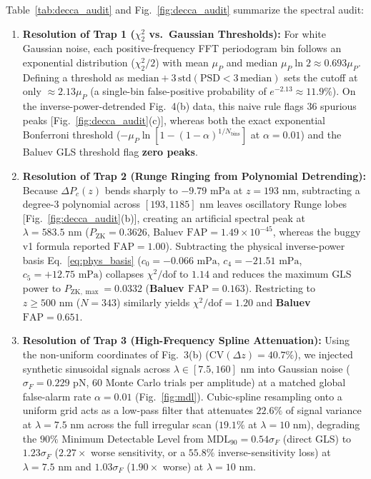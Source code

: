 \documentclass[10pt,twocolumn,a4paper]{article}
\begin{document}
Table~\ref{tab:decca_audit} and Fig.~\ref{fig:decca_audit} summarize the spectral audit:
\begin{enumerate}
\item \textbf{Resolution of Trap 1 ($\chi^2_2$ vs.\ Gaussian Thresholds):} For white Gaussian noise, each positive-frequency FFT periodogram bin follows an exponential distribution ($\chi^2_2/2$) with mean $\mu_P$ and median $\mu_P \ln 2 \approx 0.693\mu_P$. Defining a threshold as $\mathrm{median} + 3\,\mathrm{std}(\mathrm{PSD} < 3\,\mathrm{median})$ sets the cutoff at only $\approx 2.13\mu_P$ (a single-bin false-positive probability of $e^{-2.13} \approx 11.9\%$). On the inverse-power-detrended Fig.~4(b) data, this naive rule flags $36$ spurious peaks [Fig.~\ref{fig:decca_audit}(c)], whereas both the exact exponential Bonferroni threshold ($-\mu_P \ln[1 - (1-\alpha)^{1/N_{\mathrm{bins}}}]$ at $\alpha = 0.01$) and the Baluev GLS threshold flag \textbf{zero peaks}.
\item \textbf{Resolution of Trap 2 (Runge Ringing from Polynomial Detrending):} Because $\Delta P_c(z)$ bends sharply to $-9.79\text{ mPa}$ at $z = 193\text{ nm}$, subtracting a degree-3 polynomial across $[193, 1185]\text{ nm}$ leaves oscillatory Runge lobes [Fig.~\ref{fig:decca_audit}(b)], creating an artificial spectral peak at $\lambda = 583.5\text{ nm}$ ($P_{\mathrm{ZK}} = 0.3626$, Baluev $\mathrm{FAP} = 1.49\times 10^{-45}$, whereas the buggy v1 formula reported $\mathrm{FAP} = 1.00$). Subtracting the physical inverse-power basis Eq.~\eqref{eq:phys_basis} ($c_0 = -0.066\text{ mPa}$, $c_4 = -21.51\text{ mPa}$, $c_5 = +12.75\text{ mPa}$) collapses $\chi^2/\mathrm{dof}$ to $1.14$ and reduces the maximum GLS power to $P_{\mathrm{ZK},\max} = 0.0332$ (\textbf{Baluev $\mathrm{FAP} = 0.163$}). Restricting to $z \ge 500\text{ nm}$ ($N = 343$) similarly yields $\chi^2/\mathrm{dof} = 1.20$ and \textbf{Baluev $\mathrm{FAP} = 0.651$}.
\item \textbf{Resolution of Trap 3 (High-Frequency Spline Attenuation):} Using the non-uniform coordinates of Fig.~3(b) ($\mathrm{CV}(\Delta z) = 40.7\%$), we injected synthetic sinusoidal signals across $\lambda \in [7.5, 160]\text{ nm}$ into Gaussian noise ($\sigma_F = 0.229\text{ pN}$, $60$ Monte Carlo trials per amplitude) at a matched global false-alarm rate $\alpha = 0.01$ (Fig.~\ref{fig:mdl}). Cubic-spline resampling onto a uniform grid acts as a low-pass filter that attenuates $22.6\%$ of signal variance at $\lambda = 7.5\text{ nm}$ across the full irregular scan ($19.1\%$ at $\lambda = 10\text{ nm}$), degrading the $90\%$ Minimum Detectable Level from $\mathrm{MDL}_{90} = 0.54\sigma_F$ (direct GLS) to $1.23\sigma_F$ ($2.27\times$ worse sensitivity, or a $55.8\%$ inverse-sensitivity loss) at $\lambda = 7.5\text{ nm}$ and $1.03\sigma_F$ ($1.90\times$ worse) at $\lambda = 10\text{ nm}$.
\end{enumerate}
\end{document}
